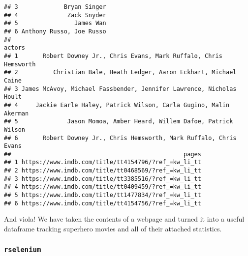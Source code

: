 \documentclass[]{article}
\begin{document}
\begin{verbatim}
## 3             Bryan Singer
## 4              Zack Snyder
## 5                James Wan
## 6 Anthony Russo, Joe Russo
##                                                                actors
## 1       Robert Downey Jr., Chris Evans, Mark Ruffalo, Chris Hemsworth
## 2          Christian Bale, Heath Ledger, Aaron Eckhart, Michael Caine
## 3 James McAvoy, Michael Fassbender, Jennifer Lawrence, Nicholas Hoult
## 4     Jackie Earle Haley, Patrick Wilson, Carla Gugino, Malin Akerman
## 5              Jason Momoa, Amber Heard, Willem Dafoe, Patrick Wilson
## 6       Robert Downey Jr., Chris Hemsworth, Mark Ruffalo, Chris Evans
##                                                 pages
## 1 https://www.imdb.com/title/tt4154796/?ref_=kw_li_tt
## 2 https://www.imdb.com/title/tt0468569/?ref_=kw_li_tt
## 3 https://www.imdb.com/title/tt3385516/?ref_=kw_li_tt
## 4 https://www.imdb.com/title/tt0409459/?ref_=kw_li_tt
## 5 https://www.imdb.com/title/tt1477834/?ref_=kw_li_tt
## 6 https://www.imdb.com/title/tt4154756/?ref_=kw_li_tt
\end{verbatim}

And viola! We have taken the contents of a webpage and turned it into a
useful dataframe tracking superhero movies and all of their attached
statistics.

\hypertarget{rselenium}{%
\subsubsection{\texorpdfstring{\texttt{rselenium}}{rselenium}}\label{rselenium}}
\end{document}
